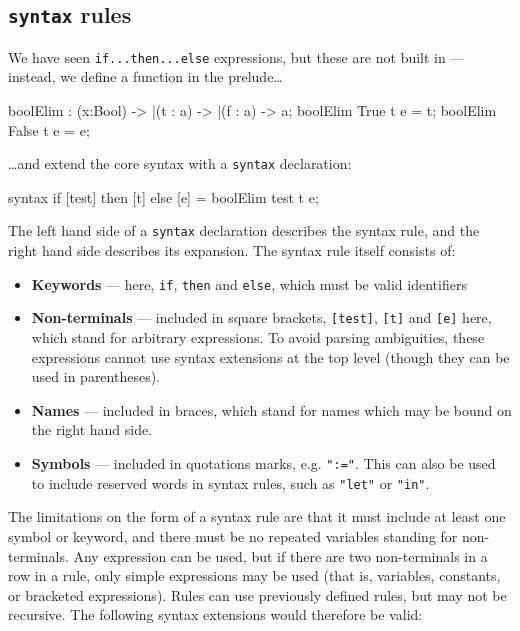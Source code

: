 \subsection{\texttt{syntax} rules}

We have seen \texttt{if...then...else} expressions, but these are not built in --- instead, we define a function in the prelude\ldots

\begin{code}
boolElim : (x:Bool) -> |(t : a) -> |(f : a) -> a; 
boolElim True  t e = t;
boolElim False t e = e;
\end{code}

\noindent
\ldots and extend the core syntax with a \texttt{syntax} declaration:

\begin{code}
syntax if [test] then [t] else [e] = boolElim test t e;
\end{code}

\noindent
The left hand side of a \texttt{syntax} declaration describes the syntax rule, and the right hand side describes its expansion.
The syntax rule itself consists of:

\begin{itemize}
\item \textbf{Keywords} --- here, \texttt{if}, \texttt{then} and \texttt{else}, which must be valid identifiers
\item \textbf{Non-terminals} --- included in square brackets, \texttt{[test]}, \texttt{[t]} and \texttt{[e]} here, which stand for arbitrary expressions.
To avoid parsing ambiguities, these expressions cannot use syntax extensions at the top level (though they can be used in parentheses).
\item \textbf{Names} --- included in braces, which stand for names which may be bound on the right hand side.
\item \textbf{Symbols} --- included in quotations marks, e.g. \texttt{":="}.
This can also be used to include reserved words in syntax rules, such as \texttt{"let"} or \texttt{"in"}.
\end{itemize}

\noindent
The limitations on the form of a syntax rule are that it must include at least one symbol or keyword, and there must be no repeated variables standing for non-terminals.
Any expression can be used, but if there are two non-terminals in a row in a rule, only simple expressions may be used (that is, variables, constants, or bracketed expressions).
Rules can use previously defined rules, but may not be recursive.
The following syntax extensions would therefore be valid:

